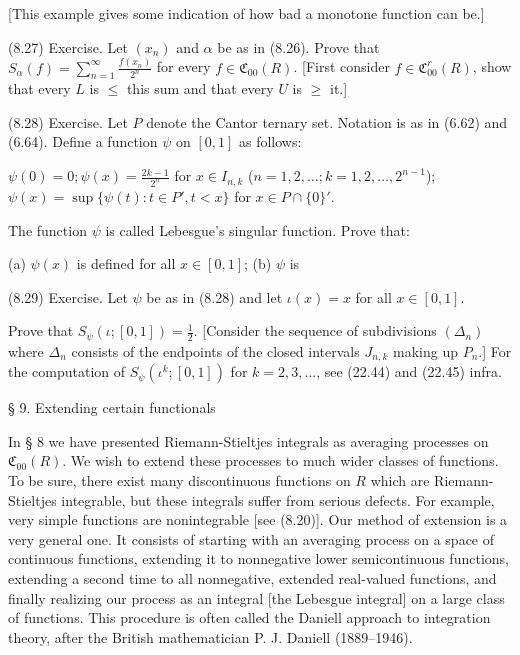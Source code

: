 [This example gives some indication of how bad a monotone function can be.]

(8.27) Exercise. Let $(x_n)$ and $\alpha$ be as in (8.26). Prove that $S_\alpha(f) = \sum_{n=1}^{\infty} \frac{f(x_n)}{2^n}$ for every $f \in \mathfrak{C}_{00}(R)$. [First consider $f \in \mathfrak{C}_{00}^r(R)$, show that every $L$ is $\leq$ this sum and that every $U$ is $\geq$ it.]

(8.28) Exercise. Let $P$ denote the Cantor ternary set. Notation is as in (6.62) and (6.64). Define a function $\psi$ on $[0, 1]$ as follows:

$\psi(0) = 0;
\psi(x) = \frac{2k-1}{2^n}$ for $x \in I_{n,k}$ ($n=1, 2, \ldots; k=1, 2, \ldots, 2^{n-1}$);
$\psi(x) = \sup\{\psi(t) : t \in P', t < x\}$ for $x \in P \cap \{0\}'$.

The function $\psi$ is called Lebesgue's singular function. Prove that:

(a) $\psi(x)$ is defined for all $x \in [0, 1]$;
(b) $\psi$ is

(8.29) Exercise. Let $\psi$ be as in (8.28) and let $\iota(x) = x$ for all $x \in [0, 1]$.

Prove that $S_{\psi}(\iota; [0, 1]) = \frac{1}{2}$. [Consider the sequence of subdivisions $(\Delta_n)$ where $\Delta_n$ consists of the endpoints of the closed intervals $J_{n,k}$ making up $P_n$.] For the computation of $S_{\psi}(\iota^k; [0, 1])$ for $k = 2, 3, \ldots$, see (22.44) and (22.45) infra.

§ 9. Extending certain functionals

In § 8 we have presented Riemann-Stieltjes integrals as averaging processes on $\mathfrak{C}_{00}(R)$. We wish to extend these processes to much wider classes of functions. To be sure, there exist many discontinuous functions on $R$ which are Riemann-Stieltjes integrable, but these integrals suffer from serious defects. For example, very simple functions are nonintegrable [see (8.20)]. Our method of extension is a very general one. It consists of starting with an averaging process on a space of continuous functions, extending it to nonnegative lower semicontinuous functions, extending a second time to all nonnegative, extended real-valued functions, and finally realizing our process as an integral [the Lebesgue integral] on a large class of functions. This procedure is often called the Daniell approach to integration theory, after the British mathematician P. J. Daniell (1889–1946).